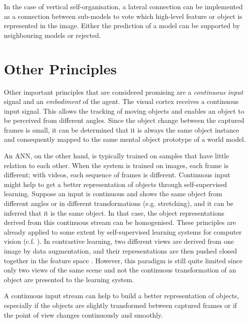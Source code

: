\begin{implementation}
	In the case of vertical self-organisation, a lateral connection can be implemented as a connection between sub-models to vote which high-level feature or object is represented in the image. Either the prediction of a model can be supported by neighbouring models or rejected.
\end{implementation}


\section{Other Principles}
Other important principles that are considered promising are a \emph{continuous input} signal and an \emph{embodiment} of the agent.
The visual cortex receives a continuous input signal.
This allows the tracking of moving objects and enables an object to be perceived from different angles. Since the object change between the captured frames is small, it can be determined that it is always the same object instance and consequently mapped to the same mental object prototype of a world model.

An ANN, on the other hand, is typically trained on samples that have little relation to each other.
When the system is trained on images, each frame is different; with videos, each sequence of frames is different.
Continuous input might help to get a better representation of objects through self-supervised learning.
Suppose an input is continuous and shows the same object from different angles or in different transformations (e.g. stretching), and it can be inferred that it is the same object. In that case, the object representations derived from this continuous stream can be homogenised.
These principles are already applied to some extent by self-supervised learning systems for computer vision (c.f. ).
In contrastive learning, two different views are derived from one image by data augmentation, and their representations are then pushed closed together in the feature space .
However, this paradigm is still quite limited since only two views of the same scene and not the continuous transformation of an object are presented to the learning system.

\begin{claim}
	A continuous input stream can help to build a better representation of objects, especially if the objects are slightly transformed between captured frames or if the point of view changes continuously and smoothly.
\end{claim}


